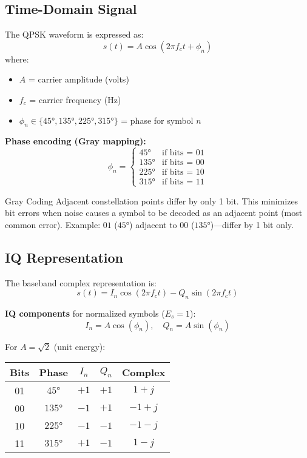 \subsection{Time-Domain Signal}

The QPSK waveform is expressed as:
\begin{equation}
s(t) = A \cos(2\pi f_c t + \phi_n)
\end{equation}
where:
\begin{itemize}
\item $A$ = carrier amplitude (volts)
\item $f_c$ = carrier frequency (Hz)
\item $\phi_n \in \{45°, 135°, 225°, 315°\}$ = phase for symbol $n$
\end{itemize}

\textbf{Phase encoding (Gray mapping):}
\begin{equation}
\phi_n = \begin{cases}
45° & \text{if bits = 01} \\
135° & \text{if bits = 00} \\
225° & \text{if bits = 10} \\
315° & \text{if bits = 11}
\end{cases}
\end{equation}

\begin{calloutbox}{Gray Coding}
Adjacent constellation points differ by only 1 bit. This minimizes bit errors when noise causes a symbol to be decoded as an adjacent point (most common error). Example: $01$ ($45°$) adjacent to $00$ ($135°$)---differ by 1 bit only.
\end{calloutbox}

\subsection{IQ Representation}

The baseband complex representation is:
\begin{equation}
s(t) = I_n \cos(2\pi f_c t) - Q_n \sin(2\pi f_c t)
\end{equation}

\textbf{IQ components} for normalized symbols ($E_s = 1$):
\begin{equation}
I_n = A \cos(\phi_n), \quad Q_n = A \sin(\phi_n)
\end{equation}

For $A = \sqrt{2}$ (unit energy):

\begin{center}
\begin{tabular}{@{}ccccc@{}}
\toprule
Bits & Phase & $I_n$ & $Q_n$ & Complex \\
\midrule
01 & $45°$ & $+1$ & $+1$ & $1+j$ \\
00 & $135°$ & $-1$ & $+1$ & $-1+j$ \\
10 & $225°$ & $-1$ & $-1$ & $-1-j$ \\
11 & $315°$ & $+1$ & $-1$ & $1-j$ \\
\bottomrule
\end{tabular}
\end{center}

